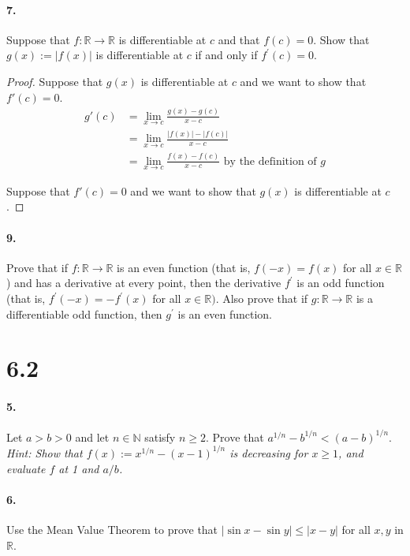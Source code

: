 \documentclass[12pt]{article}
\theoremstyle{remark}
\begin{document}
\paragraph{7.} Suppose that $f: \mathbb{R} \rightarrow \mathbb{R}$ is differentiable at $c$ and that $f(c)=0$. Show that $g(x):=|f(x)|$ is differentiable at $c$ if and only if $f^{\prime}(c)=0$.
\begin{proof}
    Suppose that $g(x)$ is differentiable at $c$ and we want to show that $f'(c) = 0$.
    \begin{align*}
        g'(c) &= \lim_{x \to c} \frac{g(x) - g(c)}{x - c} \\
        &= \lim_{x \to c} \frac{|f(x)| - |f(c)|}{x - c} \\
        &= \lim_{x \to c} \frac{f(x) - f(c)}{x - c} \text{ by the definition of $g$}
    \end{align*}

    Suppose that $f'(c) = 0$ and we want to show that $g(x)$ is differentiable at $c$.
\end{proof}

\paragraph{9.} Prove that if $f: \mathbb{R} \rightarrow \mathbb{R}$ is an even function (that is, $f(-x)=f(x)$ for all $x \in \mathbb{R}$) and has a derivative at every point, then the derivative $f^{\prime}$ is an odd function (that is, $f^{\prime}(-x)=-f^{\prime}(x)$ for all $x \in \mathbb{R})$. Also prove that if $g: \mathbb{R} \rightarrow \mathbb{R}$ is a differentiable odd function, then $g^{\prime}$ is an even function.

\section*{6.2}
\paragraph{5.} Let $a>b>0$ and let $n \in \mathbb{N}$ satisfy $n \geq 2$. Prove that $a^{1 / n}-b^{1 / n}<(a-b)^{1 / n}$. \emph{Hint: Show that $f(x):=x^{1 / n}-(x-1)^{1 / n}$ is decreasing for $x \geq 1$, and evaluate $f$ at 1 and $a / b$.}

\paragraph{6.} Use the Mean Value Theorem to prove that $|\sin x-\sin y| \leq|x-y|$ for all $x, y$ in $\mathbb{R}$.
\end{document}
